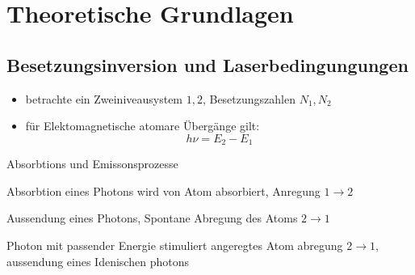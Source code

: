 \documentclass[10pt, aspectratio=169]{beamer}
\begin{document}
\section{Theoretische Grundlagen}

\subsection{Besetzungsinversion und Laserbedingungungen}
\begin{frame}
  \begin{itemize}
  \item betrachte ein Zweiniveausystem \(1,2\), Besetzungszahlen
    \(N_1, N_2\)
  \item f\"ur Elektomagnetische atomare \"Uberg\"ange gilt:
    \begin{equation}
      h\nu = E_2 - E_1
    \end{equation}
  \end{itemize}
  \pause
  \begin{block}{Absorbtions und Emissonsprozesse}
    \begin{description}
    \item<2->[Absorbtion] Absorbtion eines Photons wird von Atom
      absorbiert, Anregung \(1\rightarrow 2\)
    \item<3->[Spontane Emission] Aussendung eines Photons, Spontane
      Abregung des Atoms \(2\rightarrow 1\)

    \item<4->[Stimulierte Emission] Photon mit passender
      Energie stimuliert angeregtes
      Atom abregung \(2\rightarrow 1\), aussendung eines Idenischen
      photons
    \end{description}
  \end{block}
\end{frame}
\end{document}
